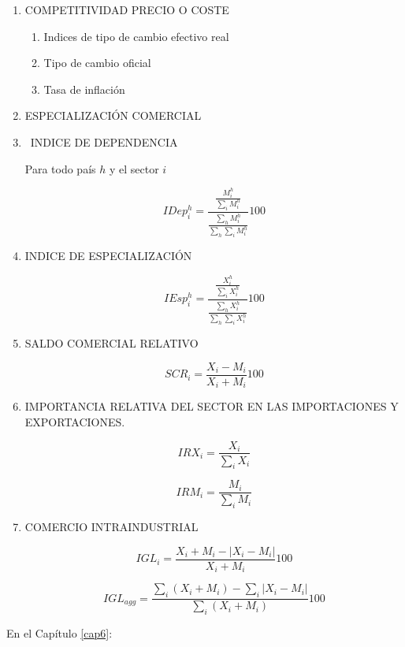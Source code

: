 \documentclass[a4paper,openright,12pt]{book}
\begin{document}
\begin{enumerate}
    \item COMPETITIVIDAD PRECIO O COSTE
    \begin{enumerate}
        \item Indices de tipo de cambio efectivo real
        \item Tipo de cambio oficial
        \item Tasa de inflación
    \end{enumerate}

    \item ESPECIALIZACIÓN COMERCIAL

    \item  INDICE DE DEPENDENCIA

    Para todo país $h$ y el sector $i$

    $$IDep^h_i = \frac{\frac{M^h_i}{\sum_i M^h_i}}{\frac{\sum_h M^h_i}{\sum_h \sum_i M^h_i}} 100$$

    \item  INDICE DE ESPECIALIZACIÓN

    $$IEsp^h_i = \frac{\frac{X^h_i}{\sum_i X^h_i}}{\frac{\sum_h X^h_i}{\sum_h \sum_i X^h_i}} 100$$

    \item  SALDO COMERCIAL RELATIVO

    $$SCR_i = \frac{X_i - M_i}{X_i + M_i} 100$$

    \item IMPORTANCIA RELATIVA DEL SECTOR EN LAS IMPORTACIONES Y EXPORTACIONES.

    $$IRX_i = \frac{X_i}{\sum_i X_i}$$

    $$IRM_i = \frac{M_i}{\sum_i M_i}$$

    \item COMERCIO INTRAINDUSTRIAL

    $$IGL_i = \frac{X_i + M_i - |X_i - M_i|}{X_i + M_i}100$$

    $$IGL_{agg} = \frac{\sum_i(X_i + M_i) - \sum_i |X_i - M_i|}{\sum_i (X_i + M_i)}100$$

\end{enumerate}

En el Capítulo \ref{cap6}:
\end{document}
